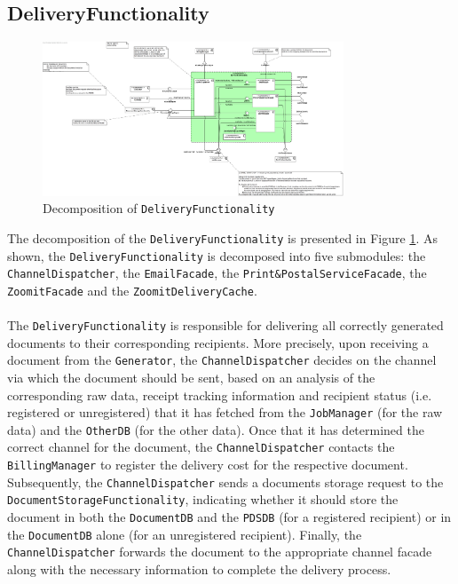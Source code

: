 \documentclass[a4paper,10pt]{article}
\begin{document}
\subsection{DeliveryFunctionality}\label{subsec:decomp-DeliveryFunctionality}
\begin{figure}[!htp]
	\centering
	\includegraphics[width=0.8\textwidth]{DeliveryFunctionality.png}
	\caption{Decomposition of \texttt{DeliveryFunctionality}}
	\label{fig:decomp-DeliveryFunctionality}
\end{figure}
\FloatBarrier
\noindent
The decomposition of the \texttt{DeliveryFunctionality} is presented in Figure \ref{fig:decomp-DeliveryFunctionality}. As shown, the \texttt{DeliveryFunctionality} is decomposed into five submodules: the \texttt{ChannelDispatcher}, the \texttt{EmailFacade}, the \texttt{Print\&PostalServiceFacade}, the \texttt{ZoomitFacade} and the \texttt{ZoomitDeliveryCache}.\\\\
The \texttt{DeliveryFunctionality} is responsible for delivering all correctly generated documents to their corresponding recipients. More precisely, upon receiving a document from the \texttt{Generator}, the \texttt{ChannelDispatcher} decides on the channel via which the document should be sent, based on an analysis of the corresponding raw data, receipt tracking information and recipient status (i.e. registered or unregistered) that it has fetched from the \texttt{JobManager} (for the raw data) and the \texttt{OtherDB} (for the other data). Once that it has determined the correct channel for the document, the \texttt{ChannelDispatcher} contacts the \texttt{BillingManager} to register the delivery cost for the respective document. Subsequently, the \texttt{ChannelDispatcher} sends a documents storage request to the \texttt{DocumentStorageFunctionality}, indicating whether it should store the document in both the \texttt{DocumentDB} and the \texttt{PDSDB} (for a registered recipient) or in the \texttt{DocumentDB} alone (for an unregistered recipient). Finally, the \texttt{ChannelDispatcher} forwards the document to the appropriate channel facade along with the necessary information to complete the delivery process.\\\\
\end{document}
